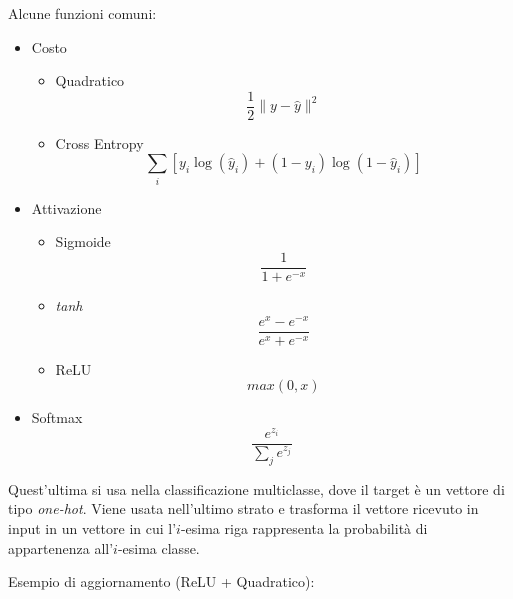 \documentclass{article}
\begin{document}
Alcune funzioni comuni:
\begin{itemize}
    \item Costo
        \begin{itemize}
            \item Quadratico
                $$\frac12\|y-\hat y\|^2$$
            \item Cross Entropy
                $$\sum_i\left[y_i\log(\hat{y}_i)+(1-y_i)\log(1-\hat{y}_i)\right]$$
        \end{itemize}
    \item Attivazione
        \begin{itemize}
            \item Sigmoide
                $$\frac1{1+e^{-x}}$$
            \item \textit{tanh}
                $$\frac{e^x-e^{-x}}{e^x+e^{-x}}$$
            \item ReLU
                $$max(0,x)$$
        \end{itemize}
    \item Softmax
        $$\frac{e^{z_i}}
{\sum_j e^{z_j}}$$
\end{itemize}

Quest'ultima si usa nella classificazione multiclasse, dove il target è un vettore di tipo \textit{one-hot}. Viene usata nell'ultimo strato e trasforma il vettore ricevuto in input in un vettore in cui l'$i$-esima riga rappresenta la probabilità di appartenenza all'$i$-esima classe.\newpage

Esempio di aggiornamento (ReLU + Quadratico):
\end{document}
